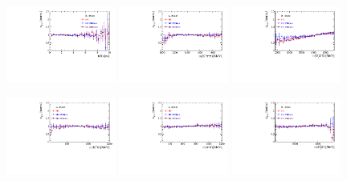 \begin{figure}[h]
\includegraphics[height=!,width=0.32\textwidth]{figs/dataVsMC/signal_pid/eff_PID_Ds2KKpi_1_Bs_DTF_TAU.pdf}
\includegraphics[height=!,width=0.32\textwidth]{figs/dataVsMC/signal_pid/eff_PID_Ds2KKpi_1_m_Kpipi.pdf}
\includegraphics[height=!,width=0.32\textwidth]{figs/dataVsMC/signal_pid/eff_PID_Ds2KKpi_1_m_Dspipi.pdf}

\includegraphics[height=!,width=0.32\textwidth]{figs/dataVsMC/signal_pid/eff_PID_Ds2KKpi_1_m_Kpi.pdf}
\includegraphics[height=!,width=0.32\textwidth]{figs/dataVsMC/signal_pid/eff_PID_Ds2KKpi_1_m_pipi.pdf}
\includegraphics[height=!,width=0.32\textwidth]{figs/dataVsMC/signal_pid/eff_PID_Ds2KKpi_1_m_Dspi.pdf}
\caption{}
\label{fig:}
\end{figure}

